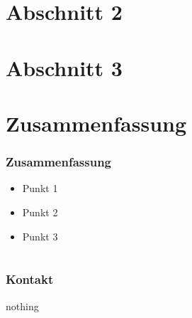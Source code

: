\documentclass[%
14pt
]{beamer}
\begin{document}
\section{Abschnitt 2}

\section{Abschnitt 3}

\section{Zusammenfassung}

\begin{frame}
	\frametitle{Zusammenfassung}
	\begin{itemize}
		\item Punkt 1
		\item Punkt 2
		\item Punkt 3
	\end{itemize}
\end{frame}


\section*{} %

\begin{frame}
\frametitle{Kontakt}
nothing
\end{frame}

\end{document}
